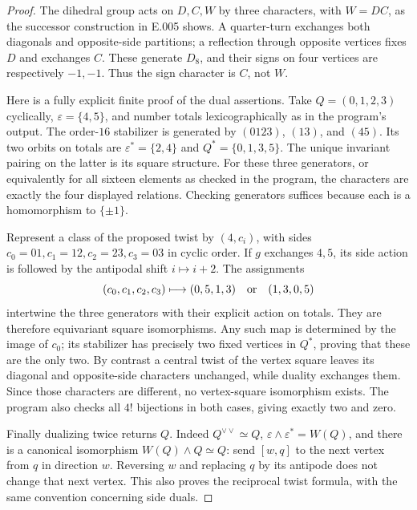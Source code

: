 \begin{proof}
The dihedral group acts on $D,C,W$ by three characters, with
$W=DC$, as the successor construction in E.005 shows. A quarter-turn
exchanges both diagonals and opposite-side partitions; a reflection
through opposite vertices fixes $D$ and exchanges $C$. These generate
$D_8$, and their signs on four vertices are respectively $-1,-1$.
Thus the sign character is $C$, not $W$.

Here is a fully explicit finite proof of the dual assertions. Take
$Q=(0,1,2,3)$ cyclically, $\varepsilon=\{4,5\}$, and number totals
lexicographically as in the program's output. The order-$16$ stabilizer
is generated by $(0123)$, $(13)$, and $(45)$. Its two orbits on totals
are $\varepsilon^*=\{2,4\}$ and $Q^*=\{0,1,3,5\}$. The unique invariant
pairing on the latter is its square structure. For these three generators,
or equivalently for all sixteen elements as checked in the program,
the characters are exactly the four displayed relations. Checking generators
suffices because each is a homomorphism to $\{\pm1\}$.

Represent a class of the proposed twist by $(4,c_i)$, with sides
$c_0=01,c_1=12,c_2=23,c_3=03$ in cyclic order. If $g$ exchanges $4,5$,
its side action is followed by the antipodal shift $i\mapsto i+2$.
The assignments
\[
 (c_0,c_1,c_2,c_3)\longmapsto(0,5,1,3)
 \quad\hbox{or}\quad(1,3,0,5)
\]
intertwine the three generators with their explicit action on totals.
They are therefore equivariant square isomorphisms. Any such map is
determined by the image of $c_0$; its stabilizer has precisely two fixed
vertices in $Q^*$, proving that these are the only two. By contrast a
central twist of the vertex square leaves its diagonal and opposite-side
characters unchanged, while duality exchanges them. Since those characters
are different, no vertex-square isomorphism exists. The program also
checks all $4!$ bijections in both cases, giving exactly two and zero.

Finally dualizing twice returns $Q$. Indeed $Q^{\vee\vee}\simeq Q$,
$\varepsilon\wedge\varepsilon^*=W(Q)$, and there is a canonical
isomorphism $W(Q)\wedge Q\simeq Q$: send $[w,q]$ to the next vertex
from $q$ in direction $w$. Reversing $w$ and replacing $q$ by its
antipode does not change that next vertex. This also proves the reciprocal
twist formula, with the same convention concerning side duals.
\end{proof}

